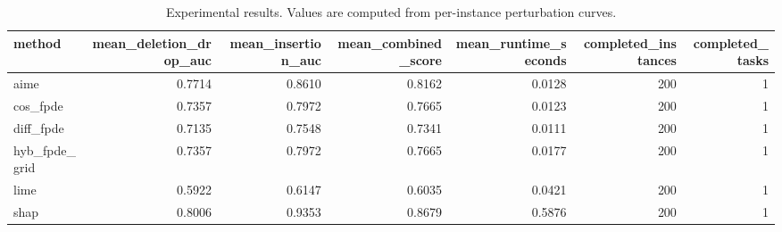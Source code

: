 \begin{table}[t]
\caption{Experimental results. Values are computed from per-instance perturbation curves.}
\label{tab:main_results_computed}
\centering
\begin{tabular}{lrrrrrr}
\toprule
method & mean\_deletion\_drop\_auc & mean\_insertion\_auc & mean\_combined\_score & mean\_runtime\_seconds & completed\_instances & completed\_tasks \\
\midrule
aime & 0.7714 & 0.8610 & 0.8162 & 0.0128 & 200 & 1 \\
cos\_fpde & 0.7357 & 0.7972 & 0.7665 & 0.0123 & 200 & 1 \\
diff\_fpde & 0.7135 & 0.7548 & 0.7341 & 0.0111 & 200 & 1 \\
hyb\_fpde\_grid & 0.7357 & 0.7972 & 0.7665 & 0.0177 & 200 & 1 \\
lime & 0.5922 & 0.6147 & 0.6035 & 0.0421 & 200 & 1 \\
shap & 0.8006 & 0.9353 & 0.8679 & 0.5876 & 200 & 1 \\
\bottomrule
\end{tabular}

\end{table}
